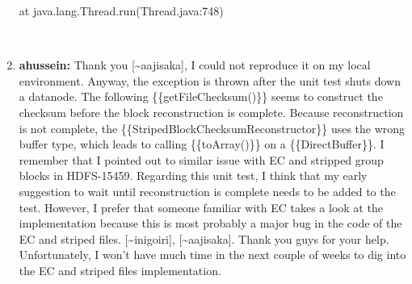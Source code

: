 \documentclass{report}%
\begin{document}
\begin{enumerate}
\begin{spverbatim}
    at java.lang.Thread.run(Thread.java:748) \end{spverbatim}\ %
\item%
\textbf{ahussein: }Thank you {[}\textasciitilde{}aajisaka{]}, I could not reproduce it on my local environment.\newline%
\newline%
\newline%
\newline%
Anyway, the exception is thrown after the unit test shuts down a datanode.\newline%
\newline%
 The following \{\{getFileChecksum()\}\} seems to construct the checksum before the block reconstruction is complete.\newline%
\newline%
 Because reconstruction is not complete, the \{\{StripedBlockChecksumReconstructor\}\} uses the wrong buffer type,\newline%
\newline%
 which leads to calling \{\{toArray()\}\} on a \{\{DirectBuffer\}\}.\newline%
\newline%
 I remember that I pointed out to similar issue with EC and stripped group blocks in HDFS{-}15459.\newline%
\newline%
\newline%
\newline%
Regarding this unit test, I think that my early suggestion to wait until reconstruction is complete needs to be added to the test.\newline%
\newline%
 However, I prefer that someone familiar with EC takes a look at the implementation because this is most probably a major bug\newline%
\newline%
 in the code of the EC and striped files.\newline%
\newline%
\newline%
\newline%
{[}\textasciitilde{}inigoiri{]}, {[}\textasciitilde{}aajisaka{]}. Thank you guys for your help. Unfortunately, I won't have much time in the next couple of weeks to dig\newline%
\newline%
 into the EC and striped files implementation.\newline%
\newline%

\end{enumerate}
\end{document}
